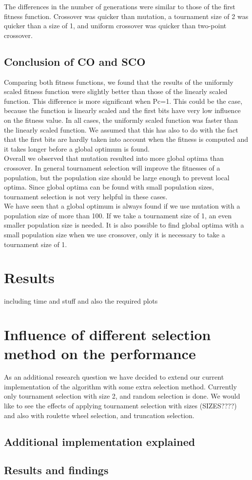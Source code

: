 \documentclass[10pt,a4paper,onecolumn]{article}
\begin{document}
The differences in the number of generations were similar to those of the first fitness function.
Crossover was quicker than mutation, a tournament size of 2 was quicker than a size of 1, and uniform crossover was quicker than two-point crossover.

\subsection{Conclusion of CO and SCO}

Comparing both fitness functions, we found that the results of the uniformly scaled fitness function were slightly better than those of the linearly scaled function.
This difference is more significant when Pc=1.
This could be the case, because the function is linearly scaled and the first bits have very low influence on the fitness value.
In all cases, the uniformly scaled function was faster than the linearly scaled function.
We assumed that this has also to do with the fact that the first bits are hardly taken into account when the fitness is computed and it takes longer before a global optimum is found. \\

Overall we observed that mutation resulted into more global optima than crossover.
In general tournament selection will improve the fitnesses of a population, but the population size should be large enough to prevent local optima.
Since global optima can be found with small population sizes, tournament selection is not very helpful in these cases. \\

We have seen that a global optimum is always found if we use mutation with a population size of more than 100. If we take a tournament size of 1, an even smaller population size is needed.
It is also possible to find global optima with a small population size when we use crossover, only it is necessary to take a tournament size of 1.


\section{Results} \label{sec:results}
including time and stuff
and also the required plots

\section{Influence of different selection method on the performance}
\label{sec:research}
As an additional research question we have decided to extend our current implementation of the algorithm with some extra selection method. Currently only tournament selection with size 2, and random selection is done. We would like to see the effects of applying tournament selection with sizes (SIZES????) and also with roulette wheel selection, and truncation selection.

\subsection{Additional implementation explained}

\subsection{Results and findings}
\end{document}
